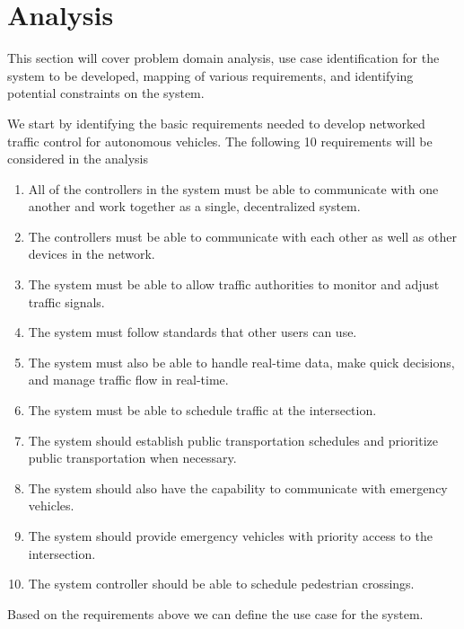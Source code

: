 \section{Analysis}
\label{sec:analysis}
This section will cover problem domain analysis, use case identification for the system to be developed, mapping of various requirements, and identifying potential constraints on the system. 

We start by identifying the basic requirements needed to develop networked traffic control for autonomous vehicles. The following 10 requirements will be considered in the analysis
\begin{enumerate}
    \item All of the controllers in the system must be able to communicate with one another and work together as a single, decentralized system.
    \item The controllers must be able to communicate with each other as well as other devices in the network.
    \item The system must be able to allow traffic authorities to monitor and adjust traffic signals.
    \item The system must follow standards that other users can use.
    \item The system must also be able to handle real-time data, make quick decisions, and manage traffic flow in real-time.
    \item The system must be able to schedule traffic at the intersection.
    \item The system should establish public transportation schedules and prioritize public transportation when necessary.
    \item The system should also have the capability to communicate with emergency vehicles.
    \item The system should provide emergency vehicles with priority access to the intersection.
    \item The system controller should be able to schedule pedestrian crossings.
\end{enumerate}
Based on the requirements above we can define the use case for the system.  
